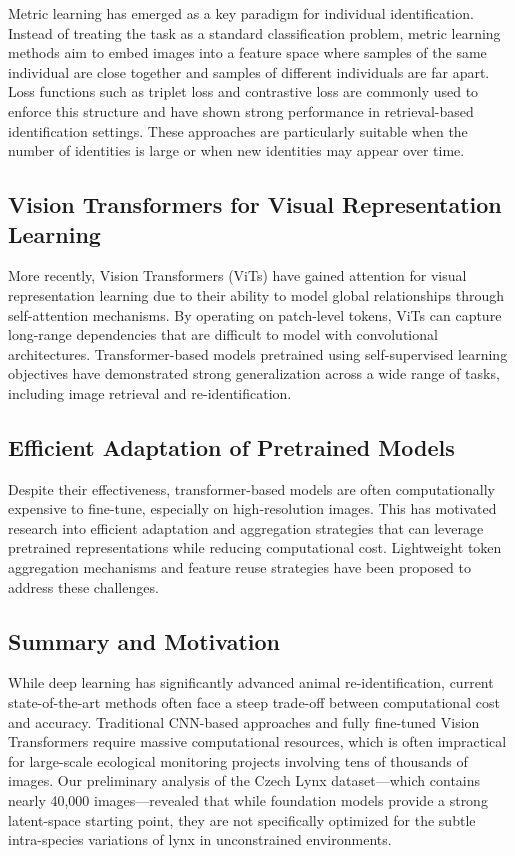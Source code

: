 \documentclass{article}
\begin{document}
Metric learning has emerged as a key paradigm for individual identification. Instead of treating the task as a standard classification problem, metric learning methods aim to embed images into a feature space where samples of the same individual are close together and samples of different individuals are far apart. Loss functions such as triplet loss and contrastive loss are commonly used to enforce this structure and have shown strong performance in retrieval-based identification settings. These approaches are particularly suitable when the number of identities is large or when new identities may appear over time.

\subsection{Vision Transformers for Visual Representation Learning}

More recently, Vision Transformers (ViTs) have gained attention for visual representation learning due to their ability to model global relationships through self-attention mechanisms. By operating on patch-level tokens, ViTs can capture long-range dependencies that are difficult to model with convolutional architectures. Transformer-based models pretrained using self-supervised learning objectives have demonstrated strong generalization across a wide range of tasks, including image retrieval and re-identification.

\subsection{Efficient Adaptation of Pretrained Models}

Despite their effectiveness, transformer-based models are often computationally expensive to fine-tune, especially on high-resolution images. This has motivated research into efficient adaptation and aggregation strategies that can leverage pretrained representations while reducing computational cost. Lightweight token aggregation mechanisms and feature reuse strategies have been proposed to address these challenges.

\subsection{Summary and Motivation}
While deep learning has significantly advanced animal re-identification, current state-of-the-art methods often face a steep trade-off between computational cost and accuracy. Traditional CNN-based approaches and fully fine-tuned Vision Transformers require massive computational resources, which is often impractical for large-scale ecological monitoring projects involving tens of thousands of images. Our preliminary analysis of the Czech Lynx dataset—which contains nearly 40,000 images—revealed that while foundation models provide a strong latent-space starting point, they are not specifically optimized for the subtle intra-species variations of lynx in unconstrained environments.
\end{document}
